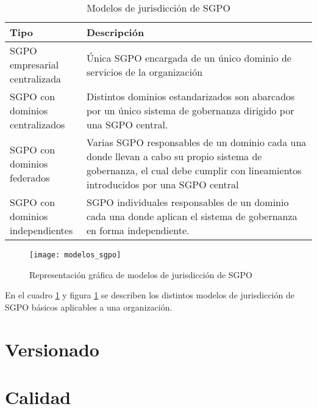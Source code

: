   \begin{table}[h]
    \begin{tabular}{p{0.25\linewidth} | p{0.75\linewidth}}
      \textbf{Tipo} & \textbf{Descripción} \\
      \hline
      SGPO empresarial centralizada & Única SGPO encargada de un único dominio de servicios de la organización\\
      \hline
      SGPO con dominios centralizados & Distintos dominios estandarizados son abarcados por un único sistema de gobernanza dirigido por una SGPO central.\\
      \hline
      SGPO con dominios federados & Varias SGPO responsables de un dominio cada una donde llevan a cabo su propio sistema de gobernanza, el cual debe cumplir con lineamientos introducidos por una SGPO central\\
      \hline
      SGPO con dominios independientes & SGPO individuales responsables de un dominio cada una donde aplican el sistema de gobernanza en forma independiente.\\
      \hline
    \end{tabular}
    \caption{Modelos de jurisdicción de SGPO}
    \label{tabla:modelos_sgpo}
  \end{table}

  \begin{figure}[h]
    \centering
    \texttt{[image: modelos\_sgpo]}
    \caption{Representación gráfica de modelos de jurisdicción de SGPO \cite{Erl:2011:SGG:1983453}}
    \label{imagen:modelos_sgpo}
  \end{figure}

  En el cuadro \ref{tabla:modelos_sgpo} y figura \ref{imagen:modelos_sgpo} se describen los distintos modelos de jurisdicción de SGPO básicos aplicables a una organización.

\section{Versionado}
\label{MarcoConceptual:versionado}

\section{Calidad}
\label{MarcoConceptual:calidad}

